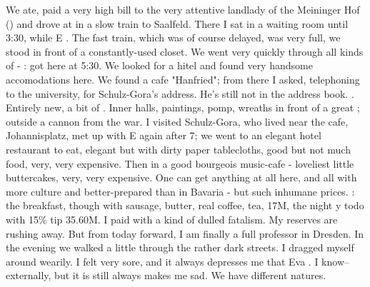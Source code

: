 \documentclass{article}
\begin{document}
We ate, paid a very high bill to the very attentive landlady of the Meininger Hof () and drove at  in a slow train to Saalfeld. There I sat in a waiting room until 3:30, while E . The fast train, which was of course delayed, was very full, we stood in front of a constantly-used closet. We went very quickly through all kinds of  - : got here at 5:30. We looked for a hitel and found very handsome accomodations here. We found a cafe "Hanfried"; from there I asked, telephoning to the university, for Schulz-Gora's address. He's still not in the address book. . Entirely new, a bit of . Inner halls, paintings, pomp, wreaths in front of a great ; outside a cannon from the war. I visited Schulz-Gora, who lived near the cafe, Johannisplatz, met up with E again after 7; we went to an elegant hotel restaurant to eat, elegant but with dirty paper tablecloths, good but not much food, very, very expensive. Then in a good bourgeois music-cafe - loveliest little buttercakes, very, very expensive. One can get anything at all here, and all with more culture and better-prepared than in Bavaria - but such inhumane prices. : the breakfast, though with sausage, butter, real coffee, tea, 17M, the night y todo with 15\%  tip 35.60M. I paid with a kind of dulled fatalism. My reserves are rushing away. But from today forward, I am finally a full professor in Dresden. In the evening we walked a little through the rather dark streets. I dragged myself around wearily. I felt very sore, and it always depresses me that Eva . I know-- externally, but it is still always makes me sad. We have different natures.
\end{document}

